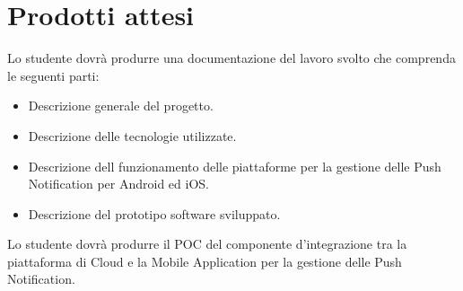 \section*{Prodotti attesi}
Lo studente dovrà produrre una documentazione del lavoro svolto che comprenda le seguenti parti:

\begin{itemize}
    \item Descrizione generale del progetto.
    \item Descrizione delle tecnologie utilizzate.
    \item Descrizione dell funzionamento delle piattaforme per la gestione delle Push Notification per Android ed iOS\@.
    \item Descrizione del prototipo software sviluppato.
\end{itemize}

Lo studente dovrà produrre il POC del componente d'integrazione tra la piattaforma di Cloud e la Mobile Application per la gestione delle Push Notification.
